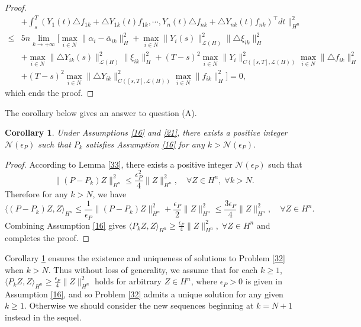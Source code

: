 \documentclass[10pt]{article}
\newtheorem{cor}{Corollary}[section]
\begin{document}
\begin{proof}
\begin{align*}
&+\int_s^T(Y_1(t)\triangle f_{1k}+\triangle Y_{1k}(t)f_{1k},\cdots,Y_n(t)\triangle f_{nk}+\triangle Y_{nk}(t)f_{nk})^{\top}dt\|^2_{H^n}\\
\leq& 5n\lim_{k\rightarrow+\infty}[\max_{i\in N}\|\alpha_i-\overline{\alpha}_{ik}\|^2_H+\max_{i\in N}\|Y_i(s)\|^2_{\mathcal{L}(H)}\|\triangle\xi_{ik}\|^2_H\\
&+\max_{i\in N}\|\triangle Y_{ik}(s)\|^2_{\mathcal{L}(H)}\|\xi_{ik}\|^2_H+(T-s)^2\max_{i\in N}\|Y_i\|^2_{C([s,T],\mathcal{L}(H))}\max_{i\in N}\|\triangle f_{ik}\|^2_H\\
&+(T-s)^2\max_{i\in N}\|\triangle Y_{ik}\|^2_{C([s,T],\mathcal{L}(H))}\max_{i\in N}\|f_{ik}\|^2_H]
=0,
\end{align*}
which ends the proof.
\end{proof}
The corollary below gives an answer to question (A).
\begin{cor}\label{37}
Under Assumptions \ref{16} and \ref{21},  there exists a positive integer  $\mathcal{N}(\epsilon_P)$ such that $P_k$ satisfies  Assumption \ref{16} for any $k>\mathcal{N}(\epsilon_P)$.
\end{cor}
\begin{proof}
According to Lemma \ref{33}, there exists a positive integer  $\mathcal{N}(\epsilon_P)$ such that
$$
\|(P-P_k)Z\|^2_{H^n}\leq \frac{\epsilon_P^2}{4}\|Z\|^2_{H^n},\quad\forall Z\in H^n,\;\forall k>N.
$$  Therefore for any $k>N$, we have
$$
\langle (P-P_k)Z,Z\rangle_{H^n} \leq \frac{1}{\epsilon_P}\|(P-P_k)Z\|^2_{H^n}+\frac{\epsilon_P}{2}\|Z\|^2_{H^n}\leq \frac{3\epsilon_P}{4}\|Z\|^2_{H^n},\quad\forall Z\in H^n.
$$
Combining Assumption \ref{16} gives
$\langle P_kZ,Z\rangle_{H^n}\geq\frac{\epsilon_P}{4}\|Z\|^2_{H^n},\;\forall Z\in H^n$ and completes the proof.
\end{proof}

Corollary \ref{37} ensures the existence and uniqueness of solutions to Problem \ref{32} when $k>N$. Thus without loss of generality, we assume  that for each $ k\geq1$,
$\langle P_kZ,Z\rangle_{H^n}\geq \frac{\epsilon_P}{4}\|Z\|^2_{H^n}$ holds for arbitrary $Z\in H^n$,
where $\epsilon_P>0$ is given in Assumption \ref{16}, and so Problem \ref{32} admits a unique solution for any given $k\geq1$. Otherwise we should consider the new sequences beginning at $k=N+1$ instead in the sequel.
\end{document}
